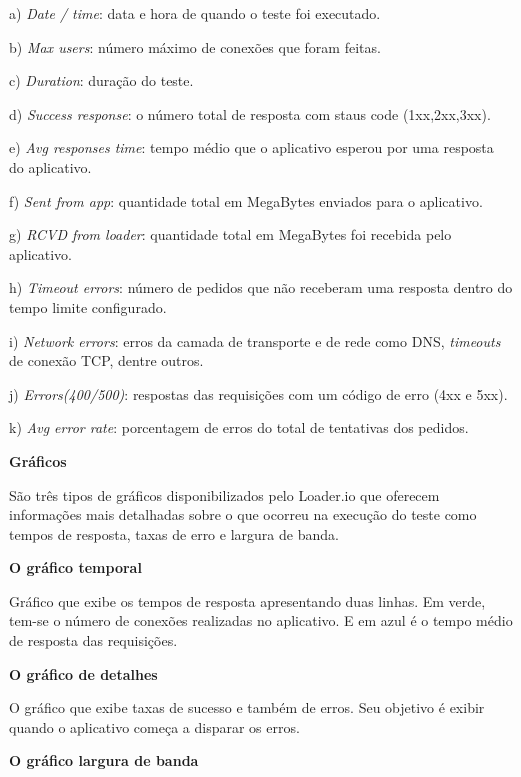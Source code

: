   \begin{compactitem}
    \item[a)] \textit{Date / time}: data e hora de quando o teste foi executado.
    \item[b)] \textit{Max users}: número máximo de conexões que foram feitas.
    \item[c)] \textit{Duration}:  duração do teste.
    \item[d)] \textit{Success response}: o número total de resposta com staus code (1xx,2xx,3xx).
    \item[e)] \textit{Avg responses time}: tempo médio que o aplicativo esperou por uma resposta do aplicativo.
    \item[f)] \textit{Sent from app}: quantidade total em MegaBytes enviados para o aplicativo.
    \item[g)] \textit{RCVD from loader}: quantidade total em MegaBytes foi recebida pelo aplicativo.
    \item[h)] \textit{Timeout errors}: número de pedidos que não receberam uma resposta dentro do tempo limite configurado.
    \item[i)] \textit{Network errors}: erros da camada de transporte e de rede como \ac{DNS}, \textit{timeouts} de conexão TCP, dentre outros.
    \item[j)] \textit{Errors(400/500)}: respostas das requisições com um código de erro (4xx e 5xx).
    \item[k)] \textit{Avg error rate}: porcentagem de erros do total de tentativas dos pedidos.
  \end{compactitem}

  \textbf{Gráficos}

  São três tipos de gráficos disponibilizados pelo Loader.io que oferecem informações mais detalhadas
  sobre o que ocorreu na execução do teste como tempos de resposta, taxas de erro e largura de banda.

  \textbf{O gráfico temporal}

  Gráfico que exibe os tempos de resposta apresentando duas linhas. Em verde, tem-se o
  número de conexões realizadas no aplicativo. E em azul é o tempo médio de resposta das requisições.

  \textbf{O gráfico de detalhes}

  O gráfico que exibe taxas de sucesso e também de erros. Seu objetivo é exibir quando o aplicativo
  começa a disparar os erros.

  \textbf{O gráfico largura de banda}

